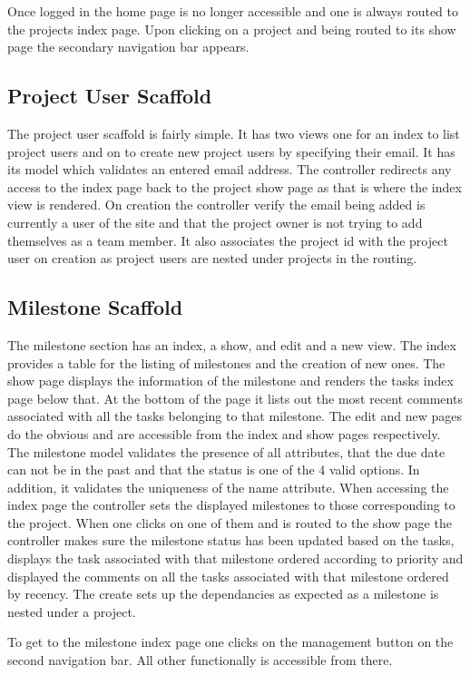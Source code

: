 \documentclass[a4wide, 11pt]{article}
\begin{document}
Once logged in the home page is no longer accessible and one is always routed to the projects index page. Upon clicking on a project and being routed to its show page the secondary navigation bar appears.

\subsection{Project User Scaffold}
The project user scaffold is fairly simple. It has two views one for an index to list project users and on to create new project users by specifying their email. It has its model which validates an entered email address. The controller redirects any access to the index page back to the project show page  as that is where the index view is rendered. On creation the controller verify the email being added is currently a user of the site and that the project owner is not trying to add themselves as a team member. It also associates the project id with the project user on creation as project users are nested under projects in the routing.
\clearpage

\subsection{Milestone Scaffold}
The milestone section has an index, a show, and edit and a new view. The index provides a table for the listing of milestones and the creation of new ones. The show page displays the information of the milestone and renders the tasks index page below that. At the bottom of the page it lists out the most recent comments associated with all the tasks belonging to that milestone. The edit and new pages do the obvious and are accessible from the index and show pages respectively. The milestone model validates the presence of all attributes, that the due date can not be in the past and that the status is one of the 4 valid options. In addition, it validates the uniqueness of the name attribute. When accessing the index page the controller sets the displayed milestones to those corresponding to the project. When one clicks on one of them and is routed to the show page the controller makes sure the milestone status has been updated based on the tasks, displays the task associated with that milestone ordered according to priority and displayed the comments on all the tasks associated with that milestone ordered by recency. The create sets up the dependancies as expected as a milestone is nested under a project. 

To get to the milestone index page one clicks on the management button on the second navigation bar. All other functionally is accessible from there.
\end{document}
